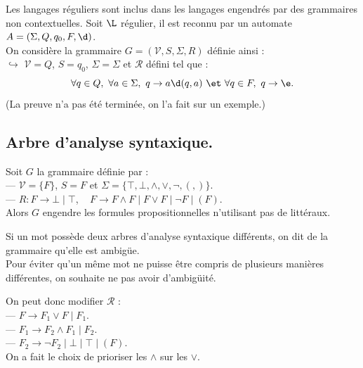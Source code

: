 \documentclass[french, 11pt]{article}
\renewcommand*{\S}{\Sigma}
\renewcommand*{\V}{\mathcal{V}}
\renewcommand*{\R}{\mathcal{R}}
\begin{document}
\begin{thm}{}{}
    Les langages réguliers sont inclus dans les langages engendrés par des grammaires non contextuelles.
    \tcblower
    Soit $\L$ régulier, il est reconnu par un automate $A=(\S,Q,q_0,F,\d)$.\\
    On considère la grammaire $G=(\V,S,\S,R)$ définie ainsi :\\
    $\hookrightarrow$ $\V=Q$, $S=q_0$, $\S=\S$ et $\R$ défini tel que : 
    \begin{equation*}
        \forall q \in Q, ~ \forall a \in \S, ~ q \to a\d(q,a) ~ \et ~ \forall q \in F, ~ q \to \e.
    \end{equation*}
    (La preuve n'a pas été terminée, on l'a fait sur un exemple.)
\end{thm}

\subsection{Arbre d'analyse syntaxique.}

\begin{ex}{}{}
    Soit $G$ la grammaire définie par :\\
    --- $\V=\{F\}$, $S=F$ et $\S=\{\top,\bot,\land,\lor,\lnot,(,)\}$.\\
    --- $R : F\to \bot \mid \top$, ~ $F\to F\land F \mid F\lor F \mid \lnot F \mid (F)$.\\
    Alors $G$ engendre les formules propositionnelles n'utilisant pas de littéraux.
\end{ex}

\begin{defi}{}{}
    Si un mot possède deux arbres d'analyse syntaxique différents, on dit de la grammaire qu'elle est ambigüe.\\
    Pour éviter qu'un même mot ne puisse être compris de plusieurs manières différentes, on souhaite ne pas avoir d'ambigüité.
\end{defi}

\begin{ex}{}{}
    On peut donc modifier $\R$ :\\
    --- $F \to F_1 \lor F \mid F_1$.\\
    --- $F_1 \to F_2 \land F_1 \mid F_2$.\\
    --- $F_2 \to \lnot F_2 \mid \bot \mid \top \mid (F)$.\\
    On a fait le choix de prioriser les $\land$ sur les $\lor$.
\end{ex}
\end{document}
